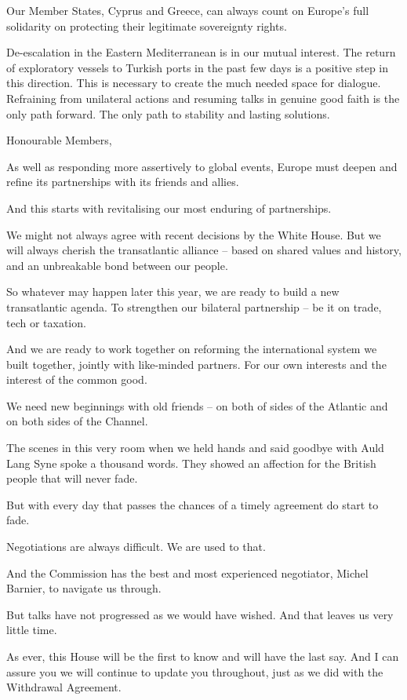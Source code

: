 \documentclass[a4paper,11pt]{article}
\begin{document}
Our Member States, Cyprus and Greece, can always count on Europe's full solidarity on protecting their legitimate sovereignty rights.  

De-escalation in the Eastern Mediterranean is in our mutual interest. The return of exploratory vessels to Turkish ports in the past few days is a positive step in this direction. This is necessary to create the much needed space for dialogue. Refraining from unilateral actions and resuming talks in genuine good faith is the only path forward.  The only path to stability and lasting solutions.

 

Honourable Members,

As well as responding more assertively to global events, Europe must deepen and refine its partnerships with its friends and allies.

And this starts with revitalising our most enduring of partnerships.

We might not always agree with recent decisions by the White House. But we will always cherish the transatlantic alliance – based on shared values and history, and an unbreakable bond between our people.

So whatever may happen later this year, we are ready to build a new transatlantic agenda. To strengthen our bilateral partnership – be it on trade, tech or taxation.

And we are ready to work together on reforming the international system we built together, jointly with like-minded partners. For our own interests and the interest of the common good.

We need new beginnings with old friends – on both of sides of the Atlantic and on both sides of the Channel.

The scenes in this very room when we held hands and said goodbye with Auld Lang Syne spoke a thousand words. They showed an affection for the British people that will never fade.

But with every day that passes the chances of a timely agreement do start to fade.

Negotiations are always difficult. We are used to that.

And the Commission has the best and most experienced negotiator, Michel Barnier, to navigate us through.

But talks have not progressed as we would have wished. And that leaves us very little time.

As ever, this House will be the first to know and will have the last say. And I can assure you we will continue to update you throughout, just as we did with the Withdrawal Agreement.
\end{document}
